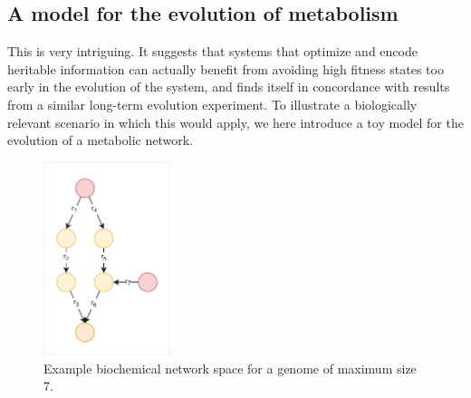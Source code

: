 \documentclass[paper=a4, fontsize=11pt,twoside]{scrartcl}       %
\begin{document}
\subsection*{A model for the evolution of metabolism}

This is very intriguing. It suggests that systems that optimize and encode heritable information can actually benefit from avoiding high fitness states too early in the evolution of the system, and finds itself in concordance with results from a similar long-term evolution experiment. \cite{woodsSecondOrderSelectionEvolvability2011} To illustrate a biologically relevant scenario in which this would apply, we here introduce a toy model for the evolution of a metabolic network. 

\begin{figure}[h!]
	\centering
	\includegraphics[width = 0.33\textwidth]{figures/evolving_metabolism.pdf}
	\caption{Example biochemical network space for a genome of maximum size 7.}
	\label{evomet}
\end{figure}
\end{document}
